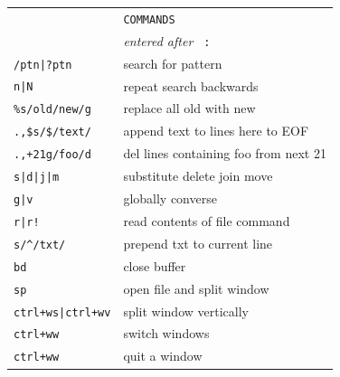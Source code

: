 \documentclass[a4paper,12pt]{article}
\begin{document}
\begin{multicols}{2}
\vfill

\begin{tabular}{ll}
&\texttt{COMMANDS}\\
&\emph{entered after }\texttt{ :}\\
\texttt{/ptn|?ptn}& search \textbar{} for pattern\\
\texttt{n|N}& repeat search \textbar{} backwards\\
\texttt{\%s/old/new/g}&replace all old with new\\
\texttt{.,\$s/\$/text/}&append text to lines here to EOF\\
\texttt{.,+21g/foo/d}&del lines containing foo from next 21\\
\texttt{s|d|j|m}&substitute \textbar{} delete \textbar{} join \textbar{}move\\
\texttt{g|v}& globally \textbar{} converse\\
\texttt{r|r!}& read contents of file \textbar{} command\\
\texttt{s/\^{}/txt/}&prepend txt to current line\\
\texttt{bd}&close buffer\\
\texttt{sp}&open file and split window\\
\texttt{ctrl+ws|ctrl+wv}&split window\textbar{} vertically\\
\texttt{ctrl+ww}&switch windows\\
\texttt{ctrl+ww}&quit a window\\
\end{tabular}


\end{multicols}
\end{document}
